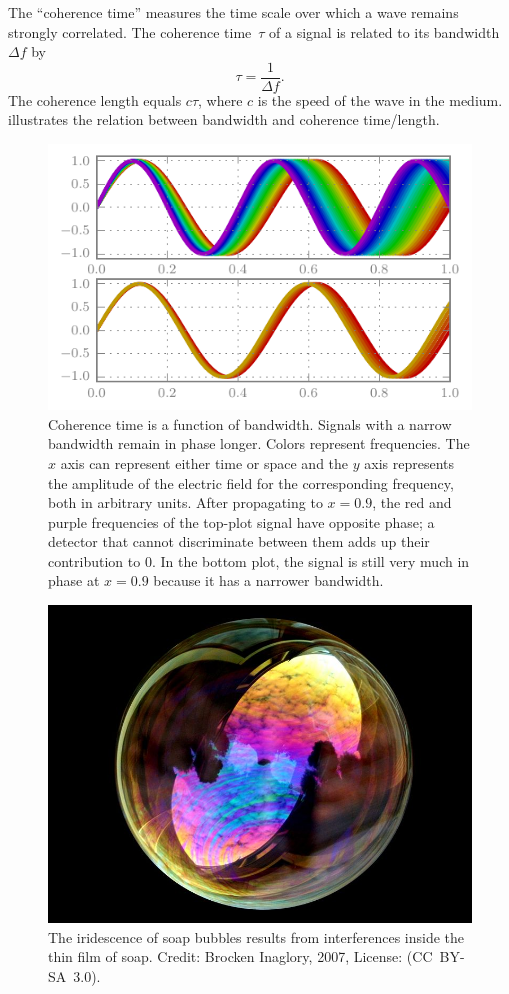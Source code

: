 The ``coherence time'' measures the time scale over which a wave remains strongly correlated.
The coherence time~$\tau$ of a signal is related to its bandwidth~$\Delta f$ by
\begin{equation}
    \tau = \frac{1}{\Delta f} \text{.}
\end{equation}
The coherence length equals $c\tau$, where $c$ is the speed of the wave in the medium.
 illustrates the relation between bandwidth and coherence time/length.

\begin{figure}
    \centering
    \includegraphics[width=.8\textwidth]{coherence}
    \caption{
        Coherence time is a function of bandwidth.
        Signals with a narrow bandwidth remain in phase longer.
        Colors represent frequencies.
        The $x$ axis can represent either time or space and the $y$ axis represents the amplitude of the electric field for the corresponding frequency, both in arbitrary units.
        After propagating to $x=0.9$, the red and purple frequencies of the top-plot signal have opposite phase; a detector that cannot discriminate between them adds up their contribution to 0.
        In the bottom plot, the signal is still very much in phase at $x=0.9$
        because it has a narrower bandwidth.
    }
    \label{fig:coherence}
\end{figure}

\begin{figure}
    \centering
    \includegraphics[width=.8\textwidth]{soap_bubble_sky}
    \caption{The iridescence of soap bubbles results from interferences inside the thin film of soap.
    Credit: Brocken Inaglory, 2007, License: (CC~BY-SA~3.0).
}
    \label{fig:soap_bubble}
\end{figure}


